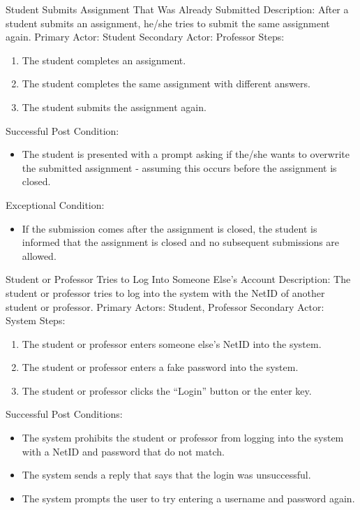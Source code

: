     \begin{section}{Student Submits Assignment That Was Already Submitted}
    Description: After a student submits an assignment, he/she tries to submit the same assignment again. \newline
    Primary Actor: Student \newline
    Secondary Actor: Professor \newline
    Steps:
    \begin{enumerate}
        \item{The student completes an assignment.}
        \item{The student completes the same assignment with different answers.}
        \item{The student submits the assignment again.}
    \end{enumerate}
    Successful Post Condition:
    \begin{itemize}
        \item{The student is presented with a prompt asking if the/she wants to overwrite the submitted assignment - assuming this occurs before the assignment is closed.} 
    \end{itemize}
    Exceptional Condition:
    \begin{itemize}
        \item{If the submission comes after the assignment is closed, the student is informed that the assignment is closed and no subsequent submissions are allowed.} 
    \end{itemize}
    \end{section}
    
    \begin{section}{Student or Professor Tries to Log Into Someone Else’s Account}
    Description: The student or professor tries to log into the  system with the NetID of another student or professor. \newline
    Primary Actors: Student, Professor \newline
    Secondary Actor: System \newline
    Steps:
    \begin{enumerate}
        \item{The student or professor enters someone else’s NetID into the system.}
        \item{The student or professor enters a fake password into the system.}
        \item{The student or professor clicks the “Login” button or the enter key.}
    \end{enumerate}
    Successful Post Conditions:
    \begin{itemize}
        \item{The system prohibits the student or professor from logging into the system with a NetID and password that do not match.}
        \item{The system sends a reply that says that the login was unsuccessful.}
        \item{The system prompts the user to try entering a username and password again.}
    \end{itemize}
    \end{section}







